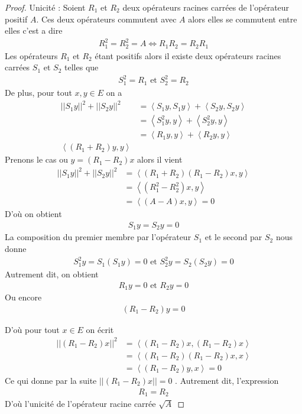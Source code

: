 \documentclass{report}
\begin{document}
{\begin{proof}
Unicité : Soient $R_1$ et $R_2$ deux opérateurs racines carrées de l'opérateur positif $A$. Ces deux opérateurs commutent avec $A$ alors elles se commutent entre elles c'est a dire 
									\begin{align*}
					 R_1^2 = R_2^2 = A \Longleftrightarrow R_1 R_2 = R_2 R_1  
									\end{align*}
Les opérateurs $R_1$ et $R_2$ étant positifs alors il existe deux opérateurs racines carrées $S_1$ et $S_2$ telles que
									\begin{align*}
					 S_1^2 = R_1     \,\,\text{et}\,\,    S_2^2 = R_2 
									\end{align*}
De plus, pour tout $x,y \in E$ on a 		
									\begin{align*}					
					 ||S_1 y||^2 + ||S_2 y||^2 &= \left< S_1y,S_1y \right> + \left< S_2y,S_2y \right> \\
					 &= \left< S_1^2y,y \right> + \left< S_2^2y,y \right> \\
					 &= \left< R_1y,y \right> + \left< R_2y,y \right> \\
					 \left< (R_1+R_2)y,y \right> 
									\end{align*}
Prenons le cas ou $y = (R_1-R_2)x$ alors il vient 
									\begin{align*}
					 ||S_1y||^2 + ||S_2y||^2 &= \left< (R_1+R_2)(R_1-R_2)x,y \right> \\
					 &= \left< (R_1^2 - R_2^2)x,y \right> \\
					 &= \left< (A-A)x,y \right> = 0
									\end{align*}
D'où on obtient 
									\begin{align*}
					 S_1y = S_2y = 0 
									\end{align*}
La composition du premier membre par l'opérateur $S_1$ et le second par $S_2$ nous donne
									\begin{align*}
					 S_1^2y = S_1(S_1y) = 0   \,\,\text{et}\,\,   S_2^2y = S_2(S_2y) = 0  
									\end{align*}
Autrement dit, on obtient 
									\begin{align*}
					 R_1 y = 0    \,\,\text{et}\,\,    R_2 y = 0 
									\end{align*}
Ou encore 	
									\begin{align*}
					 (R_1 - R_2)y = 0 
									\end{align*}




D'où pour tout $x \in E$ on écrit 
									\begin{align*}
					 ||(R_1-R_2)x||^2 &= \left< (R_1-R_2)x,(R_1-R_2)x \right> \\
					 &= \left< (R_1-R_2)(R_1-R_2)x,x \right> \\
					 &= \left< (R_1-R_2)y,x \right> = 0 
									\end{align*}
Ce qui donne par la suite $||(R_1-R_2)x|| = 0$ . Autrement dit, l'expression 
									\begin{align*}
					 R_1 = R_2 
									\end{align*}
D'où l'unicité de l'opérateur racine carrée $\sqrt{A}$ 
\end{proof}


}
\end{document}
